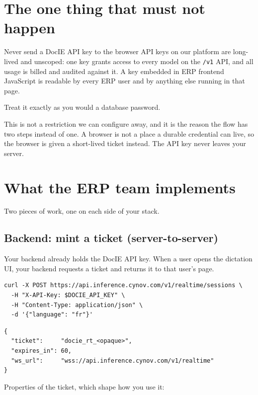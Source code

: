 \documentclass[11pt,a4paper]{article}
\begin{document}
\section{The one thing that must not happen}

\begin{dontbox}{Never send a DocIE API key to the browser}
API keys on our platform are long-lived and unscoped: one key grants access to every
model on the \texttt{/v1} API, and all usage is billed and audited against it. A key
embedded in ERP frontend JavaScript is readable by every ERP user and by anything else
running in that page.\par\smallskip
Treat it exactly as you would a database password.
\end{dontbox}

This is not a restriction we can configure away, and it is the reason the flow has two
steps instead of one. A browser is not a place a durable credential can live, so the
browser is given a short-lived ticket instead. The API key never leaves your server.

\section{What the ERP team implements}
\label{sec:erp}

Two pieces of work, one on each side of your stack.

\subsection{Backend: mint a ticket (server-to-server)}

Your backend already holds the DocIE API key. When a user opens the dictation UI, your
backend requests a ticket and returns it to that user's page.

\begin{lstlisting}
curl -X POST https://api.inference.cynov.com/v1/realtime/sessions \
  -H "X-API-Key: $DOCIE_API_KEY" \
  -H "Content-Type: application/json" \
  -d '{"language": "fr"}'
\end{lstlisting}

\begin{lstlisting}
{
  "ticket":     "docie_rt_<opaque>",
  "expires_in": 60,
  "ws_url":     "wss://api.inference.cynov.com/v1/realtime"
}
\end{lstlisting}

\noindent Properties of the ticket, which shape how you use it:
\end{document}
